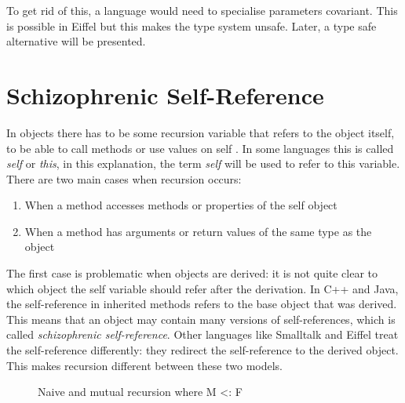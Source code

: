 To get rid of this, a language would need to specialise parameters
covariant. This is possible in Eiffel but this makes the type system
unsafe. Later, a type safe alternative will be presented.

\section{Schizophrenic Self-Reference}
\label{sec:schizoReferences}

In objects there has to be some recursion variable that refers to the
object itself, to be able to call methods or use values on self . In some
languages this is called \emph{self} or \emph{this}, in this explanation,
the term \emph{self} will be used to refer to this variable. \\

There are two main cases when recursion occurs:
\begin{enumerate}
\item When a method accesses methods or properties of the self object
\item When a method has arguments or return values of the same type as the object
\end{enumerate}

The first case is problematic when objects are derived: it is not quite
clear to which object the self variable should refer after the derivation.
In C++ and Java, the self-reference in inherited methods refers to
the base object that was derived. This means that an object may contain
many versions of self-references, which is called \emph{schizophrenic
self-reference}. Other languages like Smalltalk and Eiffel treat the
self-reference differently: they redirect the self-reference to the
derived object. This makes recursion different between these two models.

\begin{figure}
	\centering
	\caption{Naive and mutual recursion where M <: F}
	\label{fig:schizoRecursion}
\end{figure}

